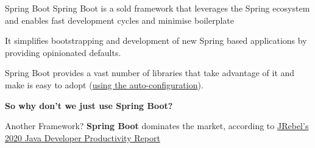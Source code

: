 \begin{frame}[t]{Spring Boot}
  Spring Boot is a sold framework that leverages the Spring ecosystem and enables fast development cycles and minimise boilerplate

  It simplifies bootstrapping and development of new Spring based applications by providing opinionated defaults.

  Spring Boot provides a vast number of libraries that take advantage of it and make is easy to adopt (\href{https://docs.spring.io/spring-boot/docs/2.0.0.M5/reference/html/boot-features-developing-auto-configuration.html}{using the auto-configuration}).

  \vspace{16pt}
  \textbf{So why don't we just use Spring Boot?}
\end{frame}




\begin{frame}[t]{Another Framework?}
  \textbf{Spring Boot} dominates the market, according to \href{https://www.jrebel.com/sites/rebel/files/pdfs/ebook-jrebel-java-productivity-report.pdf}{JRebel's 2020 Java Developer Productivity Report}


  \vspace{16pt}
  \begin{center}

  \end{center}
\end{frame}

